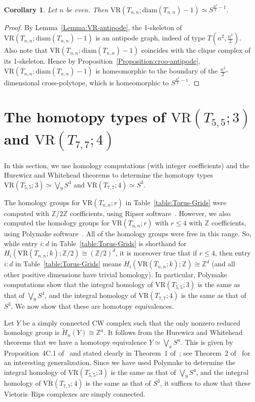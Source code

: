 \documentclass[12pt,a4paper]{amsart}
\newtheorem{corollary}[theorem]{Corollary}
\theoremstyle{definition}
\newcommand{\Z}{\ensuremath{\mathbb{Z}}}
\newcommand{\vr}[2]{\mathrm{VR}(#1;#2)}
\newcommand{\diam}{\ensuremath{\mathrm{diam}}}
\newcommand\dv{{:}} %
\numberwithin{equation}{section}
\begin{document}
\begin{corollary}
\label{cor:cross-polytopal}
Let $n$ be even.
Then $\vr{T_{n,n}}{\diam(T_{n,n})-1} \simeq S^{\frac{n^2}{2} -1}$.
\end{corollary}

\begin{proof}
By Lemma~\ref{Lemma:VR-antipode}, the 1-skeleton of $\vr{T_{n,n}}{\diam(T_{n,n})-1}$ is an antipode graph, indeed of type $T(n^2, \frac{n^2}{2})$.
Also note that $\vr{T_{n,n}}{\diam(T_{n,n})-1}$ coincides with the clique complex of its 1-skeleton.
Hence by Proposition~\ref{Proposition:croo-antipode}, $\vr{T_{n,n}}{\diam(T_{n,n})-1}$ is homeomorphic to the boundary of the $\frac{n^2}{2}$-dimensional cross-polytope, which is homeomorphic to  $S^{\frac{n^2}{2} -1}$.
\end{proof}



\section{The homotopy types of $\vr{T_{5,5}}{3}$ and $\vr{T_{7,7}}{4}$}
\label{sec:homotopy-through-homology}

In this section, we use homology computations (with integer coefficients) and the Hurewicz and Whitehead theorems to determine the homotopy types $\vr{T_{5,5}}{3}\simeq \bigvee_9 S^4$ and $\vr{T_{7,7}}{4}\simeq S^3$.

The homology groups for $\vr{T_{n,n}}{r}$ in Table~\ref{table:Torus-Grids} were computed with $\Z/2\Z$ coefficients, using Ripser software~\cite{bauer2021ripser}.
However, we also computed the homology groups for $\vr{T_{n,n}}{r}$ with $r\le 4$ with $\Z$ coefficients, using Polymake software~\cite{polymake:2000}.
All of the homology groups were free in this range.
So, while entry $i\dv d$ in Table~\ref{table:Torus-Grids} is shorthand for $H_i(\vr{T_{n,n}}{k};\Z/2) \cong (\Z/2)^d$, it is moreover true that if $r\le 4$, then entry $i\dv d$ in Table~\ref{table:Torus-Grids} means $H_i(\vr{T_{n,n}}{k};\Z) \cong \Z^d$ (and all other positive dimensions have trivial homology).
In particular, Polymake computations show that the integral homology of $\vr{T_{5,5}}{3}$ is the same as that of $\bigvee_9 S^4$, and the integral homology of $\vr{T_{7,7}}{4}$ is the same as that of $S^3$.
We now show that these are homotopy equivalences.

Let $Y$ be a simply connected CW complex such that the only nonzero reduced homology group is $\tilde{H}_n(Y)\cong\Z^a$.
It follows from the Hurewicz and Whitehead theorems that we have a homotopy equivalence $Y\simeq \bigvee_a S^n$.
This is given by Proposition~4C.1 of~\cite{Hatcher} and stated clearly in Theorem~1 of~\cite{carnero2024homotopy}; see Theorem~2 of~\cite{carnero2024homotopy} for an interesting generalization.
Since we have used Polymake to determine the integral homology of $\vr{T_{5,5}}{3}$ is the same as that of $\bigvee_9 S^4$, and the integral homology of $\vr{T_{7,7}}{4}$ is the same as that of $S^3$, it suffices to show that these Vietoris--Rips complexes are simply connected.
\end{document}
